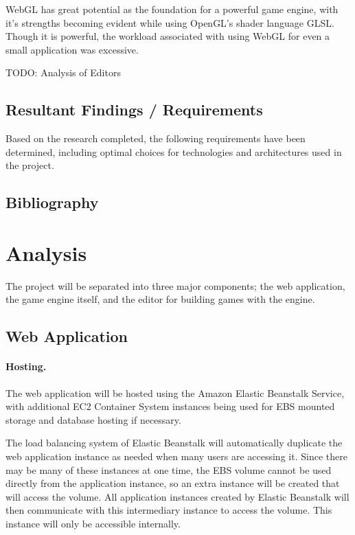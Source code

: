 \documentclass[a4paper, 12pt]{article}
\begin{document}
WebGL has great potential as the foundation for a powerful game engine, with it's strengths becoming evident while using OpenGL's shader language GLSL. Though it is powerful, the workload associated with using WebGL for even a small application was excessive.

TODO: Analysis of Editors

\subsection{Resultant Findings / Requirements}

Based on the research completed, the following requirements have been determined, including optimal choices for technologies and architectures used in the project.



\subsection{Bibliography}

{}


\section{Analysis}

The project will be separated into three major components; the web application, the game engine itself, and the editor for building games with the engine.

\subsection{Web Application}
\paragraph{Hosting.}
The web application will be hosted using the Amazon Elastic Beanstalk Service, with additional EC2 Container System instances being used for EBS mounted storage and database hosting if necessary.

The load balancing system of Elastic Beanstalk will automatically duplicate the web application instance as needed when many users are accessing it. Since there may be many of these instances at one time, the EBS volume cannot be used directly from the application instance, so an extra instance will be created that will access the volume. All application instances created by Elastic Beanstalk will then communicate with this intermediary instance to access the volume. This instance will only be accessible internally.
\end{document}
